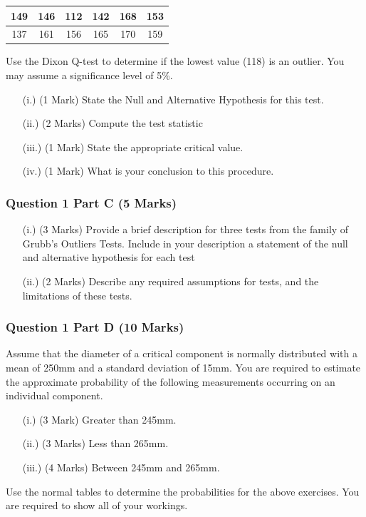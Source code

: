 \documentclass[a4paper,12pt]{article}
\begin{document}
\begin{center}
	\begin{tabular}{|c|c|c|c|c|c|}
		\hline
		149  & 146 & 112 & 142 & 168& 153\\ \hline
		137 & 161 & 156& 165&  170&  159
		\\ \hline
	\end{tabular}
\end{center}
Use the Dixon Q-test to determine if the lowest value (118) is an outlier. You may assume a significance level of 5\%.
\begin{itemize}
	\item[(i.)](1 Mark)	State the Null and Alternative Hypothesis for this test.
	\item[(ii.)](2 Marks) Compute the test statistic
	\item[(iii.)](1 Mark) State the appropriate critical value.
	\item[(iv.)](1 Mark) What is your conclusion to this procedure.
\end{itemize}
\newpage
\subsubsection*{Question 1 Part C (5 Marks)}

\begin{itemize}
	\item[(i.)] (3 Marks) Provide a brief description for three tests from the family of Grubb's  Outliers Tests. Include in your description a statement of the null and alternative hypothesis for each test
	\item[(ii.)] (2 Marks) Describe any required assumptions for tests, and the limitations of these tests.
\end{itemize}

\subsubsection*{Question 1 Part D (10 Marks)}
Assume that the diameter of a critical component is normally distributed with a mean of 250mm and a standard deviation of 15mm. You are required  to estimate the approximate probability of the following measurements occurring on an individual component.
\begin{itemize}
	\item[(i.)](3 Mark) Greater than 245mm.
	\item[(ii.)](3 Marks) Less than 265mm.
	\item [(iii.)](4 Marks) Between 245mm and 265mm.
\end{itemize}
\bigskip
\noindent Use the normal tables to determine the probabilities for the above exercises. You are required to show all of your workings.
\end{document}
